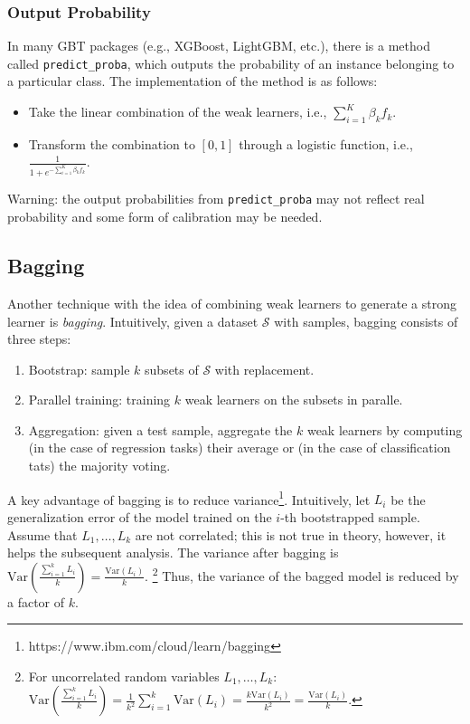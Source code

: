    \subsubsection{Output Probability}
        In many GBT packages (e.g., XGBoost, LightGBM, etc.), there is a method called \texttt{predict\_proba}, which outputs the probability of an instance belonging to a particular class.
        The implementation of the method is as follows:
        \begin{itemize}
            \item Take the linear combination of the weak learners, i.e., $\sum_{i=1}^{K}{\beta_k f_k}$.
            \item Transform the combination to $[0, 1]$ through a logistic function, i.e., $\frac{1}{1 + e^{-\sum_{i=1}^{K}{\beta_k f_k}}}$.
        \end{itemize}
    Warning: the output probabilities from \texttt{predict\_proba} may not reflect real probability and some form of calibration may be needed.
        
    
    
    
\subsection{Bagging}

Another technique with the idea of combining weak learners to generate a strong learner is \emph{bagging}.
Intuitively, given a dataset $\mathcal{S}$ with \ndata samples, bagging consists of three steps:
    \begin{enumerate}
        \item Bootstrap: sample $k$ subsets of $\mathcal{S}$ with replacement. 
        \item Parallel training: training $k$ weak learners on the subsets in paralle. 
        \item Aggregation: given a test sample, aggregate the $k$ weak learners by computing (in the case of regression tasks) their average or (in the case of classification tats) the majority voting.
    \end{enumerate}
A key advantage of bagging is to reduce variance\footnote{https://www.ibm.com/cloud/learn/bagging}.
Intuitively, let $L_i$ be the generalization error of the model trained on the $i$-th bootstrapped sample.
Assume that $L_1, \ldots, L_k$ are not correlated; this is not true in theory, however, it helps the subsequent analysis.
The variance after bagging is $\text{Var}\left(\frac{\sum_{i=1}^{k}{L_i}}{k}\right) = \frac{\text{Var}(L_i)}{k}$.
\footnote{For uncorrelated random variables $L_1, \ldots, L_k$: $\text{Var}\left(\frac{\sum_{i=1}^{k}{L_i}}{k}\right) = \frac{1}{k^2} \sum_{i=1}^{k}{\text{Var}(L_i)} = \frac{k \text{Var}(L_i)}{k^2} =  \frac{ \text{Var}(L_i)}{k}$.}
Thus, the variance of the bagged model is reduced by a factor of $k$.



